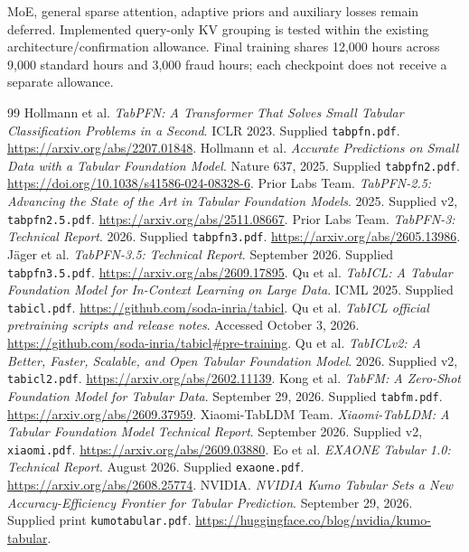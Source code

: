 \documentclass[11pt]{article}
\begin{document}
MoE, general sparse attention, adaptive priors and auxiliary losses remain deferred. Implemented query-only KV grouping is tested within the existing architecture/confirmation allowance. Final training shares 12,000 hours across 9,000 standard hours and 3,000 fraud hours; each checkpoint does not receive a separate allowance.


\clearpage
\begin{thebibliography}{99}
\small
{} Hollmann et al. \emph{TabPFN: A Transformer That Solves Small Tabular Classification Problems in a Second}. ICLR 2023. Supplied \texttt{tabpfn.pdf}. \url{https://arxiv.org/abs/2207.01848}.
 Hollmann et al. \emph{Accurate Predictions on Small Data with a Tabular Foundation Model}. Nature 637, 2025. Supplied \texttt{tabpfn2.pdf}. \url{https://doi.org/10.1038/s41586-024-08328-6}.
 Prior Labs Team. \emph{TabPFN-2.5: Advancing the State of the Art in Tabular Foundation Models}. 2025. Supplied v2, \texttt{tabpfn2.5.pdf}. \url{https://arxiv.org/abs/2511.08667}.
 Prior Labs Team. \emph{TabPFN-3: Technical Report}. 2026. Supplied \texttt{tabpfn3.pdf}. \url{https://arxiv.org/abs/2605.13986}.
 J\"ager et al. \emph{TabPFN-3.5: Technical Report}. September 2026. Supplied \texttt{tabpfn3.5.pdf}. \url{https://arxiv.org/abs/2609.17895}.
 Qu et al. \emph{TabICL: A Tabular Foundation Model for In-Context Learning on Large Data}. ICML 2025. Supplied \texttt{tabicl.pdf}. \url{https://github.com/soda-inria/tabicl}.
 Qu et al. \emph{TabICL official pretraining scripts and release notes}. Accessed October 3, 2026. \url{https://github.com/soda-inria/tabicl#pre-training}.
 Qu et al. \emph{TabICLv2: A Better, Faster, Scalable, and Open Tabular Foundation Model}. 2026. Supplied v2, \texttt{tabicl2.pdf}. \url{https://arxiv.org/abs/2602.11139}.
 Kong et al. \emph{TabFM: A Zero-Shot Foundation Model for Tabular Data}. September 29, 2026. Supplied \texttt{tabfm.pdf}. \url{https://arxiv.org/abs/2609.37959}.
 Xiaomi-TabLDM Team. \emph{Xiaomi-TabLDM: A Tabular Foundation Model Technical Report}. September 2026. Supplied v2, \texttt{xiaomi.pdf}. \url{https://arxiv.org/abs/2609.03880}.
 Eo et al. \emph{EXAONE Tabular 1.0: Technical Report}. August 2026. Supplied \texttt{exaone.pdf}. \url{https://arxiv.org/abs/2608.25774}.
 NVIDIA. \emph{NVIDIA Kumo Tabular Sets a New Accuracy-Efficiency Frontier for Tabular Prediction}. September 29, 2026. Supplied print \texttt{kumotabular.pdf}. \url{https://huggingface.co/blog/nvidia/kumo-tabular}.

\end{thebibliography}
\end{document}
